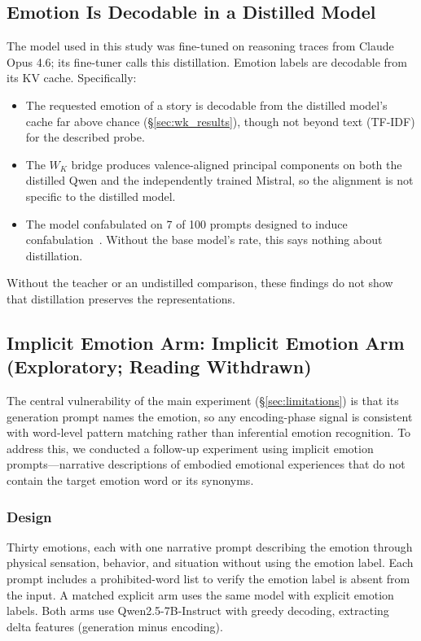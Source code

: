 \subsection{Emotion Is Decodable in a Distilled Model}

The model used in this study was fine-tuned on reasoning traces from Claude Opus 4.6; its fine-tuner calls this distillation. Emotion labels are decodable from its KV cache. Specifically:

\begin{itemize}[nosep]
    \item The requested emotion of a story is decodable from the distilled model's cache far above chance (\S\ref{sec:wk_results}), though not beyond text (TF-IDF) for the described probe.
    \item The $W_K$ bridge produces valence-aligned principal components on both the distilled Qwen and the independently trained Mistral, so the alignment is not specific to the distilled model.
    \item The model confabulated on 7 of 100 prompts designed to induce confabulation~\citep{lyra2026oracle}. Without the base model's rate, this says nothing about distillation.
\end{itemize}

Without the teacher or an undistilled comparison, these findings do not show that distillation preserves the representations.

\subsection{Implicit Emotion Arm: Implicit Emotion Arm (Exploratory; Reading Withdrawn)}
\label{sec:implicit}

The central vulnerability of the main experiment (\S\ref{sec:limitations}) is
that its generation prompt names the emotion, so any encoding-phase
signal is consistent with word-level pattern matching rather than inferential
emotion recognition. To address this, we conducted a follow-up
experiment using implicit emotion prompts---narrative descriptions of
embodied emotional experiences that do not contain the target emotion
word or its synonyms.

\subsubsection{Design}

Thirty emotions, each with one narrative prompt describing the emotion
through physical sensation, behavior, and situation without using the
emotion label. Each prompt includes a prohibited-word list to verify
the emotion label is absent from the input. A matched explicit arm
uses the same model with explicit emotion labels. Both arms use
Qwen2.5-7B-Instruct with greedy decoding, extracting delta features
(generation minus encoding).

